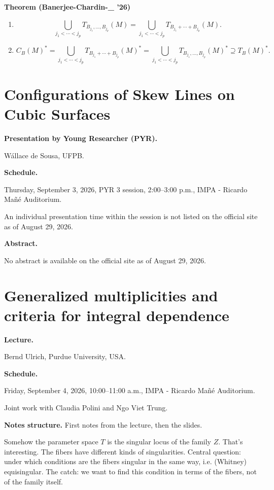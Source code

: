 \medskip\noindent
{\bf Theorem (Banerjee-Chardin-\_ '26)}

\begin{enumerate}
\item[(i)]
$$
\bigcup_{j_1<\cdots<j_p}
T_{B_{j_1},\ldots,B_{j_p}}(M)
=
\bigcup_{j_1<\cdots<j_p}
T_{B_{j_1}+\cdots+B_{j_p}}(M).
$$

\item[(ii)]
$$
C_B(M)^*
=
\bigcup_{j_1<\cdots<j_p}
T_{B_{j_1}+\cdots+B_{j_p}}(M)^*
=
\bigcup_{j_1<\cdots<j_p}
T_{B_{j_1},\ldots,B_{j_p}}(M)^*
\supseteq
T_B(M)^*.
$$
\end{enumerate}


\section{Configurations of Skew Lines on
Cubic Surfaces}
\label{section-skew-lines-cubic-surfaces}

\medskip\noindent
{\bf Presentation by Young Researcher
(PYR).}

W\'allace de Sousa,
UFPB.

\medskip\noindent
{\bf Schedule.}

Thursday, September 3, 2026,
PYR 3 session, 2:00--3:00 p.m.,
IMPA - Ricardo Ma\~n\'e Auditorium.

An individual presentation time within
the session is not listed on the
official site as of August 29, 2026.

\medskip\noindent
{\bf Abstract.}

No abstract is available on the official
site as of August 29, 2026.

\section{Generalized multiplicities and
criteria for integral dependence}
\label{section-generalized-multiplicities}

\medskip\noindent
{\bf Lecture.}

Bernd Ulrich,
Purdue University, USA.

\medskip\noindent
{\bf Schedule.}

Friday, September 4, 2026,
10:00--11:00 a.m.,
IMPA - Ricardo Ma\~n\'e Auditorium.

\medskip\noindent
Joint work with Claudia Polini and Ngo Viet
Trung.

\medskip\noindent
{\bf Notes structure.} First notes from
the lecture, then the slides.

\medskip\noindent
Somehow the parameter space $T$
is the singular locus of the family $Z$.
That's interesting. The fibers have
different kinds of singularities.
Central question: under which conditions
are the fibers singular in the same way,
i.e. (Whitney) equisingular.
The catch: we want to find this condition
in terms of the fibers, not of the family
itself.

